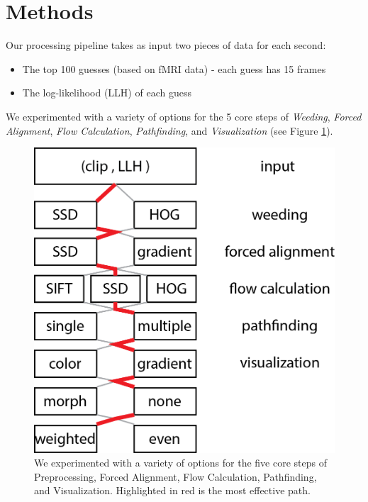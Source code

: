 
\section{Methods}

Our processing pipeline takes as input two pieces of data for each second:

\begin{itemize}
\item The top 100 guesses (based on fMRI data) - each guess has 15 frames
\item The log-likelihood (LLH) of each guess
\end{itemize}

We experimented with a variety of options for the 5 core steps of \emph{Weeding}, \emph{Forced Alignment}, \emph{Flow Calculation}, \emph{Pathfinding}, and \emph{Visualization} (see Figure \ref{fig:system}).

\begin{figure}
\centering
    \includegraphics[width=1.0\columnwidth]{figures/system.png}
\caption{We experimented with a variety of options for the five core steps of Preprocessing, Forced Alignment, Flow Calculation, Pathfinding, and Visualization.  Highlighted in red is the most effective path.}
\label{fig:system}
\end{figure}

